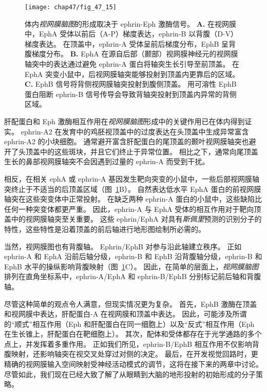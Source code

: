 \begin{figure}[htbp]
	\centering
	\texttt{[image: chap47/fig\_47\_15]}
	\caption{体内\textit{视网膜脑图}的形成取决于 ephrin-Eph 激酶信号。
		\textbf{A.} 在视网膜中，EphA 受体以前后（A-P）梯度表达，ephrin-B 以背腹（D-V）梯度表达。 
		在顶盖中，ephrin-A 受体呈前后梯度分布，EphB 呈背腹梯度分布。
		\textbf{B.} EphA 在源自后部（颞部）视网膜神经元的视网膜轴突中的表达通过避免 ephrin-A 蛋白将轴突生长引导至前顶盖。
		在 EphA 突变小鼠中，后视网膜轴突能够投射到顶盖内更靠后的区域。
		\textbf{C.} EphB 信号将背侧视网膜轴突投射到腹侧顶盖。
		用可溶性 EphB 蛋白阻断 ephrin-B 信号传导会导致背轴突投射到顶盖内异常的背侧区域。}
	\label{fig:47_15}
\end{figure}


肝配蛋白和 Eph 激酶相互作用在\textit{视网膜脑图}形成中的关键作用已在体内得到证实。
ephrin-A2 在发育中的鸡胚视顶盖中的过度表达在头顶盖中生成异常富含 ephrin-A2 的小块细胞。
通常避开富含肝配蛋白的尾顶盖的颞叶视网膜轴突也避开了头顶盖中的这些斑块，并且它们终止于异常位置。
相比之下，通常向尾顶盖生长的鼻部视网膜轴突不会因遇到过量的 ephrin-A 而受到干扰。


相反，在相关 ephA 或 ephrin-A 基因发生靶向突变的小鼠中，一些后部视网膜轴突终止于不适当的后顶盖区域（图~\ref{fig:47_15}B）。
自然表达低水平 EphA 蛋白的前视网膜轴突在这些突变体中正常投射。
在缺乏两种 ephrin-A 蛋白的小鼠中，这些缺陷比任何一种突变体都更严重。
因此，ephrin-A 与 EphA 受体的相互作用对于靶向顶盖中的视网膜轴突至关重要。
这些 ephrin/EphA 对具有\textit{斯佩里}预测的识别分子的特性，这些特性是沿着顶盖的前后轴进行地形图绘制所必需的。


当然，视网膜图也有背腹轴。
Ephrin/EphB 对参与沿此轴建立秩序。
正如 ephrin-A 和 EphA 沿前后轴分级，ephrin-B 和 EphB 沿背腹轴分级，ephrin-B 和 EphB 水平的操纵影响背腹映射（图~\ref{fig:47_15}C）。
因此，在简单的层面上，\textit{视网膜脑图}排列在直角坐标系中，ephrin-A/EphA 和 ephrin-B/EphB 分别标记前后轴和背腹轴。


尽管这种简单的观点令人满意，但现实情况更为复杂。
首先，EphB 激酶在顶盖和视网膜中表达，肝配蛋白-A 在视网膜和顶盖中表达。
因此，可能涉及所谓的“顺式”相互作用（Eph 和肝配蛋白在同一细胞上）以及“反式”相互作用（Eph 在生长锥上，肝配蛋白在靶细胞上）。
其次，配体和受体都存在于光学通路的多个点上，并发挥着多重作用。
正如我们所见，ephrin-B/EphB 相互作用不仅影响背腹映射，还影响轴突在视交叉处穿过对侧的决定。
最后，在开发视觉回路时，更精确的视网膜输入空间映射受神经活动模式的调节，这将在接下来的两章中讨论。
尽管如此，我们现在已经大致了解了从眼睛到大脑的地形投射的初始形成的分子策略。



